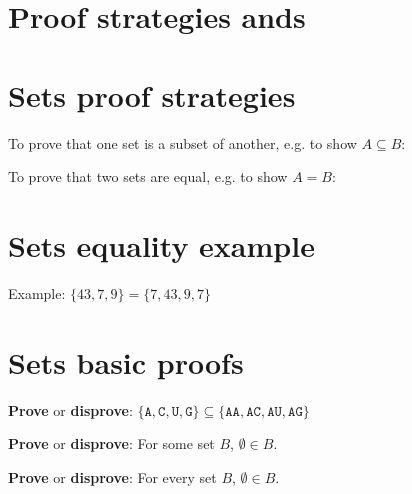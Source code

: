 \documentclass[12pt, oneside]{article}
\newcommand{\A}[0]{\texttt{A}}
\newcommand{\C}[0]{\texttt{C}}
\newcommand{\G}[0]{\texttt{G}}
\newcommand{\U}[0]{\texttt{U}}
\begin{document}
\section*{Proof strategies ands}


 \vfill
\section*{Sets proof strategies}


To prove that one set is a subset of another, e.g. to show $A \subseteq B$:

\vspace{50pt}

To prove that two sets are equal, e.g. to show $A = B$:

\vspace{50pt}
 \vfill
\section*{Sets equality example}


Example: $\{ 43, 7, 9 \} = \{ 7, 43, 9, 7\}$

\vspace{50pt}
 \vfill
\section*{Sets basic proofs}


{\bf Prove} or {\bf  disprove}: $\{ \A,  \C,  \U,  \G\} \subseteq \{ \A\A, \A\C, \A\U, \A\G \}$ 

\vspace{150pt}

{\bf Prove} or {\bf  disprove}: For some set $B$, $\emptyset \in B$.

\vspace{150pt}

{\bf Prove} or {\bf  disprove}: For every set $B$, $\emptyset \in B$.

\vspace{150pt}
\end{document}
